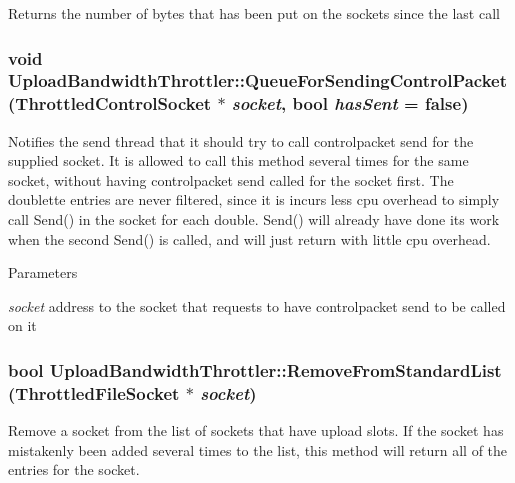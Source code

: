 \begin{DoxyReturn}{Returns}
the number of bytes that has been put on the sockets since the last call 
\end{DoxyReturn}
\subsubsection[{QueueForSendingControlPacket}]{\setlength{\rightskip}{0pt plus 5cm}void UploadBandwidthThrottler::QueueForSendingControlPacket ({\bf ThrottledControlSocket} $\ast$ {\em socket}, \/  bool {\em hasSent} = {\ttfamily false})}\label{classUploadBandwidthThrottler_acfaa5803854e19e185f9408dce1707c6}


Notifies the send thread that it should try to call controlpacket send for the supplied socket. It is allowed to call this method several times for the same socket, without having controlpacket send called for the socket first. The doublette entries are never filtered, since it is incurs less cpu overhead to simply call Send() in the socket for each double. Send() will already have done its work when the second Send() is called, and will just return with little cpu overhead.


\begin{DoxyParams}{Parameters}
\item[{\em socket}]address to the socket that requests to have controlpacket send to be called on it \end{DoxyParams}
\subsubsection[{RemoveFromStandardList}]{\setlength{\rightskip}{0pt plus 5cm}bool UploadBandwidthThrottler::RemoveFromStandardList ({\bf ThrottledFileSocket} $\ast$ {\em socket})}\label{classUploadBandwidthThrottler_a0cdc4b9fc3a72811f292fa115ff74274}


Remove a socket from the list of sockets that have upload slots. If the socket has mistakenly been added several times to the list, this method will return all of the entries for the socket.


